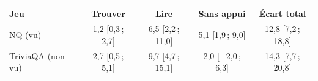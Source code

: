 \begin{tabular}{@{}lcccc@{}}
\toprule
Jeu & Trouver & Lire & Sans appui & Écart total\\
\midrule
NQ (vu) & 1{,}2 [0{,}3\,; 2{,}7] & 6{,}5 [2{,}2\,; 11{,}0] & 5{,}1 [1{,}9\,; 9{,}0] & 12{,}8 [7{,}2\,; 18{,}8]\\
TriviaQA (non vu) & 2{,}7 [0{,}5\,; 5{,}1] & 9{,}7 [4{,}7\,; 15{,}1] & 2{,}0 [$-$2{,}0\,; 6{,}3] & 14{,}3 [7{,}7\,; 20{,}8]\\
\bottomrule
\end{tabular}
